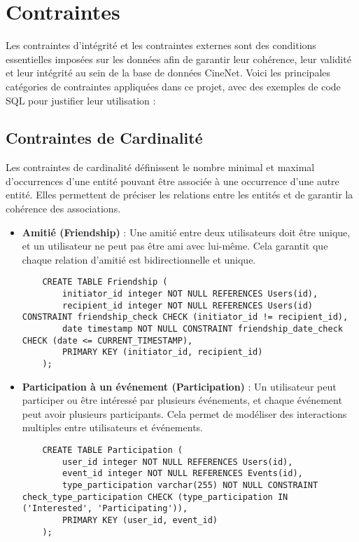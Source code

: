 \section{Contraintes}

Les contraintes d'intégrité et les contraintes externes sont des conditions essentielles imposées sur les données afin de garantir leur cohérence, leur validité et leur intégrité au sein de la base de données CineNet. Voici les principales catégories de contraintes appliquées dans ce projet, avec des exemples de code SQL pour justifier leur utilisation :

\subsection{Contraintes de Cardinalité}

Les contraintes de cardinalité définissent le nombre minimal et maximal d'occurrences d'une entité pouvant être associée à une occurrence d'une autre entité. Elles permettent de préciser les relations entre les entités et de garantir la cohérence des associations.

\begin{itemize}
    \item \textbf{Amitié (Friendship)} : Une amitié entre deux utilisateurs doit être unique, et un utilisateur ne peut pas être ami avec lui-même. Cela garantit que chaque relation d'amitié est bidirectionnelle et unique.
    \begin{lstlisting}
    CREATE TABLE Friendship (
        initiator_id integer NOT NULL REFERENCES Users(id),
        recipient_id integer NOT NULL REFERENCES Users(id) CONSTRAINT friendship_check CHECK (initiator_id != recipient_id),
        date timestamp NOT NULL CONSTRAINT friendship_date_check CHECK (date <= CURRENT_TIMESTAMP),
        PRIMARY KEY (initiator_id, recipient_id)
    );
    \end{lstlisting}
    \item \textbf{Participation à un événement (Participation)} : Un utilisateur peut participer ou être intéressé par plusieurs événements, et chaque événement peut avoir plusieurs participants. Cela permet de modéliser des interactions multiples entre utilisateurs et événements.
    \begin{lstlisting}
    CREATE TABLE Participation (
        user_id integer NOT NULL REFERENCES Users(id),
        event_id integer NOT NULL REFERENCES Events(id),
        type_participation varchar(255) NOT NULL CONSTRAINT check_type_participation CHECK (type_participation IN ('Interested', 'Participating')),
        PRIMARY KEY (user_id, event_id)
    );
    \end{lstlisting}
\end{itemize}

